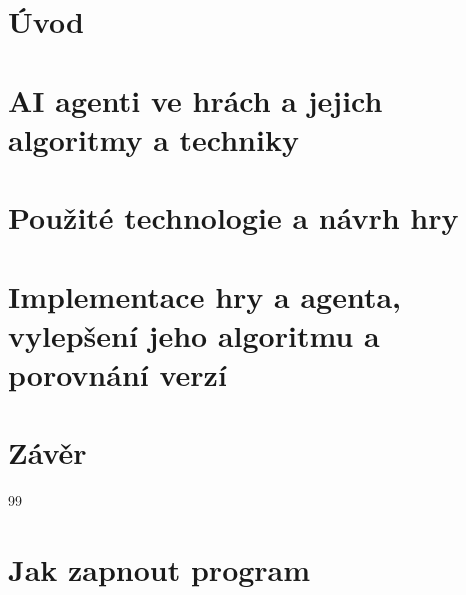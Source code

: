 \documentclass[a4paper,twoside,12pt]{book}
\begin{document}
\newpage  %
\parskip=0pt
\tableofcontents %
\parskip=7pt
\newpage %



\chapter*{Úvod} %



\chapter{AI agenti ve hrách a jejich algoritmy a techniky}



\chapter{Použité technologie a návrh hry}



\chapter{Implementace hry a agenta, vylepšení jeho algoritmu a porovnání verzí}



\chapter*{Závěr} %




\clearpage  %

\begin{thebibliography}{99}   
	
	
	
\end{thebibliography}

\newpage %
\appendix %



\chapter{Jak zapnout program}


\end{document}
